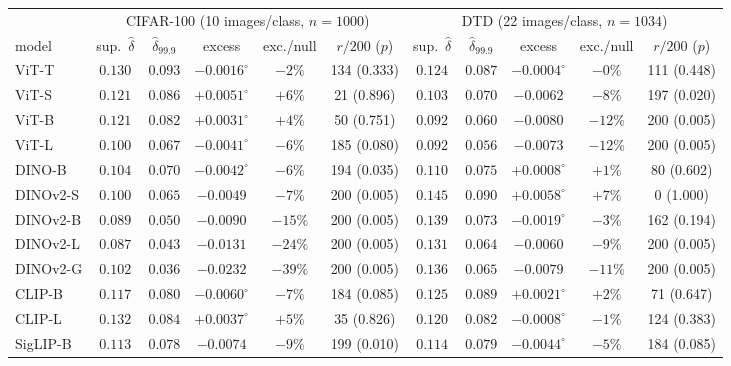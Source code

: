 \begin{table}[tbp]
\centering
\scriptsize
\setlength{\tabcolsep}{2.4pt}
\begin{tabular}{lccccc|ccccc}
\toprule
& \multicolumn{5}{c|}{CIFAR-100 (10 images/class, $n{=}1000$)} & \multicolumn{5}{c}{DTD (22 images/class, $n{=}1034$)} \\
model & sup.\ $\hat\delta$ & $\hat\delta_{99.9}$ & excess & exc./null & $r/200$ ($p$) & sup.\ $\hat\delta$ & $\hat\delta_{99.9}$ & excess & exc./null & $r/200$ ($p$) \\
\midrule
ViT-T & $0.130$ & $0.093$ & $-0.0016^{\circ}$ & $-2\%$ & 134 (0.333) & $0.124$ & $0.087$ & $-0.0004^{\circ}$ & $-0\%$ & 111 (0.448) \\
ViT-S & $0.121$ & $0.086$ & $+0.0051^{\circ}$ & $+6\%$ & 21 (0.896) & $0.103$ & $0.070$ & $-0.0062$ & $-8\%$ & 197 (0.020) \\
ViT-B & $0.121$ & $0.082$ & $+0.0031^{\circ}$ & $+4\%$ & 50 (0.751) & $0.092$ & $0.060$ & $-0.0080$ & $-12\%$ & 200 (0.005) \\
ViT-L & $0.100$ & $0.067$ & $-0.0041^{\circ}$ & $-6\%$ & 185 (0.080) & $0.092$ & $0.056$ & $-0.0073$ & $-12\%$ & 200 (0.005) \\
\midrule
DINO-B & $0.104$ & $0.070$ & $-0.0042^{\circ}$ & $-6\%$ & 194 (0.035) & $0.110$ & $0.075$ & $+0.0008^{\circ}$ & $+1\%$ & 80 (0.602) \\
DINOv2-S & $0.100$ & $0.065$ & $-0.0049$ & $-7\%$ & 200 (0.005) & $0.145$ & $0.090$ & $+0.0058^{\circ}$ & $+7\%$ & 0 (1.000) \\
DINOv2-B & $0.089$ & $0.050$ & $-0.0090$ & $-15\%$ & 200 (0.005) & $0.139$ & $0.073$ & $-0.0019^{\circ}$ & $-3\%$ & 162 (0.194) \\
DINOv2-L & $0.087$ & $0.043$ & $-0.0131$ & $-24\%$ & 200 (0.005) & $0.131$ & $0.064$ & $-0.0060$ & $-9\%$ & 200 (0.005) \\
DINOv2-G & $0.102$ & $0.036$ & $-0.0232$ & $-39\%$ & 200 (0.005) & $0.136$ & $0.065$ & $-0.0079$ & $-11\%$ & 200 (0.005) \\
\midrule
CLIP-B & $0.117$ & $0.080$ & $-0.0060^{\circ}$ & $-7\%$ & 184 (0.085) & $0.125$ & $0.089$ & $+0.0021^{\circ}$ & $+2\%$ & 71 (0.647) \\
CLIP-L & $0.132$ & $0.084$ & $+0.0037^{\circ}$ & $+5\%$ & 35 (0.826) & $0.120$ & $0.082$ & $-0.0008^{\circ}$ & $-1\%$ & 124 (0.383) \\
SigLIP-B & $0.113$ & $0.078$ & $-0.0074$ & $-9\%$ & 199 (0.010) & $0.114$ & $0.079$ & $-0.0044^{\circ}$ & $-5\%$ & 184 (0.085) \\

\end{tabular}
\end{table}
